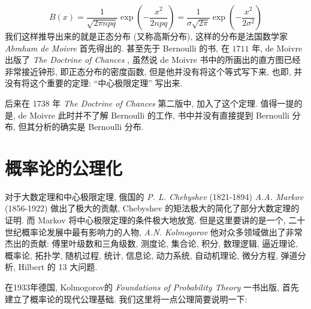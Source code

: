 \documentclass[a4paper, 10pt]{ctexart} %
\begin{document}
\[
B \left(x\right)  = \frac{1}{\sqrt{2\pi npq }} \exp  \left( - \frac{x^{2}}{2npq}\right) = \frac{1}{\sigma \sqrt{2\pi}} \exp  \left( - \frac{x^{2}}{ 2 \sigma ^{2}}\right)
\]
我们这样推导出来的就是正态分布 (又称高斯分布), 
这样的分布是法国数学家 {\em Abraham de Moivre} 首先得出的. 甚至先于 Bernoulli 的书, 在 $1711$ 年, de Moivre 出版了 {\em The Doctrine of Chances} , 虽然说 de Moivre 书中的所画出的直方图已经非常接近钟形, 即正态分布的密度函数, 但是他并没有将这个等式写下来, 也即, 并没有将这个重要的定理: ``中心极限定理'' 写出来. 

后来在 1738 年 {\em The Doctrine of Chances} 第二版中, 加入了这个定理. 
值得一提的是, de Moivre 此时并不了解 Bernoulli 的工作, 书中并没有直接提到 
Bernoulli 分布, 但其分析的确实是 Bernoulli 分布. 

\section{概率论的公理化}
对于大数定理和中心极限定理, 
俄国的 {\em P. L. Chebyshev} (1821-1894) 
{\em A.A. Markov} (1856-1922) 做出了极大的贡献,  Chebyshev 的矩法极大的简化了部分大数定理的证明. 
而 Markov 将中心极限定理的条件极大地放宽. 但是这里要讲的是一个, 二十世纪概率论发展中最有影响力的人物,  {\em A.N. Kolmogorov} 他对众多领域做出了非常杰出的贡献: 
傅里叶级数和三角级数, 测度论, 集合论, 积分, 数理逻辑, 逼近理论, 概率论, 拓扑学, 随机过程, 统计, 信息论, 动力系统, 自动机理论, 微分方程, 弹道分析, Hilbert 的 13 大问题. 

在1933年德国, Kolmogorov的 {\em Foundations of Probability Theory} 一书出版, 首先建立了概率论的现代公理基础. 我们这里将一点公理简要说明一下:
\end{document}
